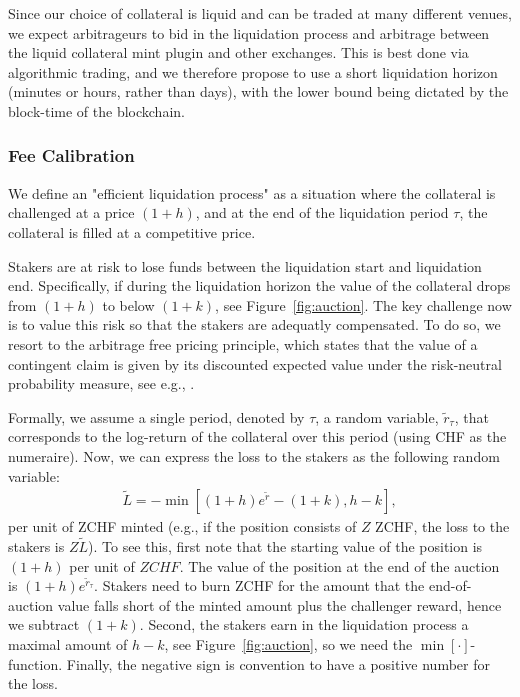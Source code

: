 \documentclass[english,11pt]{article}
\begin{document}
Since our choice of collateral is liquid and can be traded at many different venues,
we expect arbitrageurs to bid in the liquidation process and arbitrage
between the liquid collateral mint plugin and other exchanges.
This is best done via algorithmic trading, and we therefore propose to use a short
liquidation horizon (minutes or hours, rather than days), with the lower
bound being dictated by the block-time of the blockchain.

\subsubsection{Fee Calibration}
We define an "efficient liquidation process" as a situation where
the collateral is challenged at a price $(1+h)$, and at the end of the
liquidation period $\tau$, the collateral is filled at a competitive price.

Stakers are at risk to lose funds between the liquidation start and liquidation end.
Specifically, if during the liquidation horizon the value of the collateral drops 
from $(1+h)$ to below $(1+k)$, see Figure~\ref{fig:auction}.
The key challenge now is to value this risk so that the stakers
are adequatly compensated. To do so, we resort to the arbitrage free pricing principle,
which states that the value of a contingent claim is given by
its discounted expected value under the risk-neutral probability measure,
see e.g., \cite{bjork2009arbitrage}.

Formally, we assume a single period, denoted by $\tau$, a random
variable, $\tilde{r}_{\tau}$, that corresponds to the log-return of the collateral over this period (using CHF as the numeraire).
Now, we can express the loss to the stakers as the following random variable:
\begin{align}
\tilde{L} = -\min\left[(1 + h) e^{\tilde{r}} - (1+k), h-k\right],\label{eq:loss}
\end{align}
per unit of ZCHF minted (e.g., if the position consists of $Z$ ZCHF, the loss to the stakers is $Z\tilde{L}$).
To see this, first note that the starting value of the position is $(1 + h)$ per unit of $ZCHF$.
The value of the position
at the end of the auction is $(1 + h) e^{\tilde{r}_{\tau}}$. Stakers need to burn ZCHF for the amount that the end-of-auction value falls short
of the minted amount plus the challenger reward, hence we subtract $(1+k)$. 
Second, the stakers earn in the liquidation process a maximal amount of $h-k$, see
Figure~\ref{fig:auction}, so we need the $\min[\cdot]$-function. 
Finally, the negative sign is 
convention to have a positive number for the loss.
\end{document}

